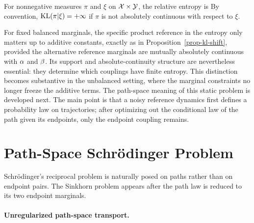 \begin{defn}\label{def-measure-relative-entropy}
	For nonnegative measures $\pi$ and $\xi$ on $\mathcal{X}\times\mathcal{Y}$, the relative entropy is
		By convention, $\operatorname{KL}(\pi|\xi)=+\infty$ if $\pi$ is not absolutely continuous with respect to $\xi$.
\end{defn}
%
For fixed balanced marginals, the specific product reference in the entropy only matters up to additive constants, exactly as in Proposition~\ref{prop-kl-shift}, provided the alternative reference marginals are mutually absolutely continuous with $\alpha$ and $\beta$. Its support and absolute-continuity structure are nevertheless essential: they determine which couplings have finite entropy. This distinction becomes substantive in the unbalanced setting, where the marginal constraints no longer freeze the additive terms.
%
The path-space meaning of this static problem is developed next. The main point is that a noisy reference dynamics first defines a probability law on trajectories; after optimizing out the conditional law of the path given its endpoints, only the endpoint coupling remains.



\section{Path-Space Schr\"odinger Problem}
\label{sec-path-space-schrodinger}

Schr\"odinger's reciprocal problem is naturally posed on paths rather than on endpoint pairs. The Sinkhorn problem appears after the path law is reduced to its two endpoint marginals.

\paragraph{Unregularized path-space transport.}

